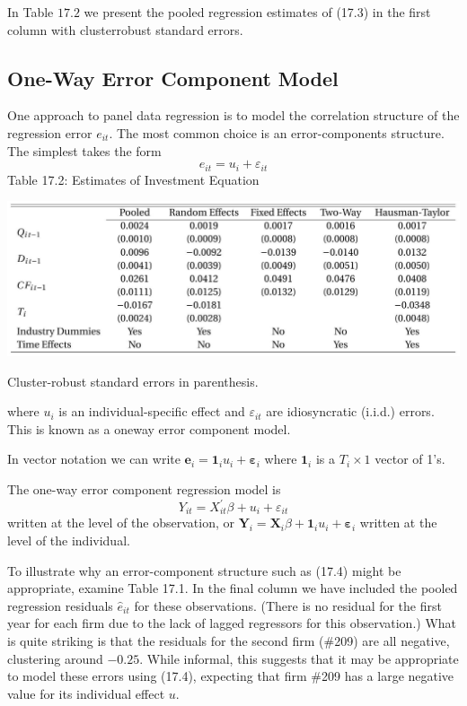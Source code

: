 \documentclass[10pt]{article}
\begin{document}
In Table $17.2$ we present the pooled regression estimates of (17.3) in the first column with clusterrobust standard errors.

\subsection{One-Way Error Component Model}
One approach to panel data regression is to model the correlation structure of the regression error $e_{i t}$. The most common choice is an error-components structure. The simplest takes the form
$$
e_{i t}=u_{i}+\varepsilon_{i t}
$$
Table 17.2: Estimates of Investment Equation

\includegraphics[max width=\textwidth]{2022_10_23_acbfcce1ea7ce1901e2dg-05}

Cluster-robust standard errors in parenthesis.

where $u_{i}$ is an individual-specific effect and $\varepsilon_{i t}$ are idiosyncratic (i.i.d.) errors. This is known as a oneway error component model.

In vector notation we can write $\boldsymbol{e}_{i}=\mathbf{1}_{i} u_{i}+\boldsymbol{\varepsilon}_{i}$ where $\mathbf{1}_{i}$ is a $T_{i} \times 1$ vector of 1's.

The one-way error component regression model is
$$
Y_{i t}=X_{i t}^{\prime} \beta+u_{i}+\varepsilon_{i t}
$$
written at the level of the observation, or $\boldsymbol{Y}_{i}=\boldsymbol{X}_{i} \beta+\mathbf{1}_{i} u_{i}+\boldsymbol{\varepsilon}_{i}$ written at the level of the individual.

To illustrate why an error-component structure such as (17.4) might be appropriate, examine Table 17.1. In the final column we have included the pooled regression residuals $\widehat{e}_{i t}$ for these observations. (There is no residual for the first year for each firm due to the lack of lagged regressors for this observation.) What is quite striking is that the residuals for the second firm (\#209) are all negative, clustering around $-0.25$. While informal, this suggests that it may be appropriate to model these errors using (17.4), expecting that firm \#209 has a large negative value for its individual effect $u$.
\end{document}
